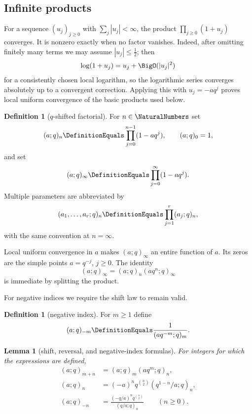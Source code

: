 \documentclass[11pt,oneside]{article}
\newtheorem{lemma}[theorem]{Lemma}
\theoremstyle{definition}
\newtheorem{definition}[theorem]{Definition}
\begin{document}
\subsection{Infinite products}

For a sequence $(u_j)_{j\ge0}$ with $\sum_j|u_j|<\infty$, the product $\prod_{j\ge0}(1+u_j)$ converges. It is nonzero exactly when no factor vanishes. Indeed, after omitting finitely many terms we may assume $|u_j|\le \frac12$; then
\[
 \log(1+u_j)=u_j+\BigO(|u_j|^2)
\]
for a consistently chosen local logarithm, so the logarithmic series converges absolutely up to a convergent correction. Applying this with $u_j=-a q^j$ proves local uniform convergence of the basic products used below.

\begin{definition}[$q$-shifted factorial]
For $n\in\NaturalNumbers$ set
\[
 (a;q)_n\DefinitionEquals\prod_{j=0}^{n-1}(1-aq^j),\qquad (a;q)_0=1,
\]
and set
\[
 (a;q)_\infty\DefinitionEquals\prod_{j=0}^{\infty}(1-aq^j).
\]
Multiple parameters are abbreviated by
\[
 (a_1,\ldots,a_r;q)_n\DefinitionEquals\prod_{j=1}^{r}(a_j;q)_n,
\]
with the same convention at $n=\infty$.
\end{definition}

Local uniform convergence in $a$ makes $(a;q)_\infty$ an entire function of $a$. Its zeros are the simple points $a=q^{-j}$, $j\ge0$. The identity
\begin{equation}\label{eq:tail-factor}
 (a;q)_\infty=(a;q)_n(aq^n;q)_\infty
\end{equation}
is immediate by splitting the product.

For negative indices we require the shift law to remain valid.

\begin{definition}[negative index]
For $m\ge1$ define
\[
 (a;q)_{-m}\DefinitionEquals\frac{1}{(aq^{-m};q)_m}.
\]
\end{definition}

\begin{lemma}[shift, reversal, and negative-index formulas]\label{lem:pochhammer-calculus}
For integers for which the expressions are defined,
\begin{align}
 (a;q)_{m+n}&=(a;q)_m(aq^m;q)_n,\label{eq:shift-law}\\
 (a;q)_n&=(-a)^nq^{\binom n2}(q^{1-n}/a;q)_n,\label{eq:reversal-law}\\
 (a;q)_{-n}&=\frac{(-q/a)^nq^{\binom n2}}{(q/a;q)_n}\qquad(n\ge0).\label{eq:negative-law}
\end{align}
\end{lemma}
\end{document}
